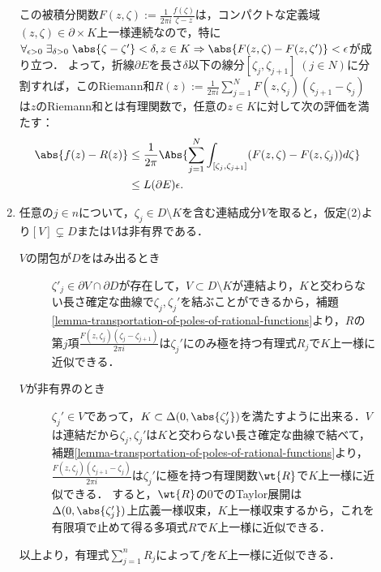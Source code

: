 \documentclass[uplatex, dvipdfmx]{jsreport}
\begin{document}
\begin{Proof}
\begin{description}
\begin{enumerate}
            この被積分関数$F(z,\zeta):=\frac{1}{2\pi i}\frac{f(\zeta)}{\zeta-z}$は，コンパクトな定義域$(z,\zeta)\in\partial\times K$上一様連続なので，特に$\forall_{\epsilon>0}\;\exists_{\delta>0}\;\abs{\zeta-\zeta'}<\delta,z\in K\Rightarrow\abs{F(z,\zeta)-F(z,\zeta')}<\epsilon$が成り立つ．
            よって，折線$\partial E$を長さ$\delta$以下の線分$[\zeta_j,\zeta_{j+1}]\;(j\in N)$に分割すれば，このRiemann和$R(z):=\frac{1}{2\pi i}\sum^N_{j=1}F(z,\zeta_j)(\zeta_{j+1}-\zeta_j)$は$z$のRiemann和とは有理関数で，任意の$z\in K$に対して次の評価を満たす：
            \begin{align*}
                \abs{f(z)-R(z)}&\le\frac{1}{2\pi}\Abs{\sum^N_{j=1}\int_{[\zeta_j,\zeta_{j+1}]}(F(z,\zeta)-F(z,\zeta_j))d\zeta}\\
                &\le L(\partial E)\epsilon.
            \end{align*}
            \item 
            任意の$j\in n$について，$\zeta_j\in D\setminus K$を含む連結成分$V$を取ると，仮定(2)より$[V]\subsetneq D$または$V$は非有界である．
            \begin{description}
                \item[$V$の閉包が$D$をはみ出るとき] $\zeta'_j\in\partial V\cap\partial D$が存在して，$V\subset D\setminus K$が連結より，$K$と交わらない長さ確定な曲線で$\zeta_j,\zeta_j'$を結ぶことができるから，補題\ref{lemma-transportation-of-poles-of-rational-functions}より，$R$の第$j$項$\frac{F(z,\zeta_j)(\zeta_j-\zeta_{j+1})}{2\pi i}$は$\zeta_j'$にのみ極を持つ有理式$R_j$で$K$上一様に近似できる．
                \item[$V$が非有界のとき] $\zeta_j'\in V$であって，$K\subset\Delta(0,\abs{\zeta_j'})$を満たすように出来る．$V$は連結だから$\zeta_j,\zeta_j'$は$K$と交わらない長さ確定な曲線で結べて，補題\ref{lemma-transportation-of-poles-of-rational-functions}より，$\frac{F(z,\zeta_j)(\zeta_{j+1}-\zeta_j)}{2\pi i}$は$\zeta_j'$に極を持つ有理関数$\wt{R}$で$K$上一様に近似できる．
                すると，$\wt{R}$の$0$でのTaylor展開は$\Delta(0,\abs{\zeta_j'})$上広義一様収束，$K$上一様収束するから，これを有限項で止めて得る多項式$R$で$K$上一様に近似できる．
            \end{description}
            以上より，有理式$\sum_{j=1}^nR_j$によって$f$を$K$上一様に近似できる．
        \end{enumerate}
    \end{description}
\end{Proof}
\end{document}
